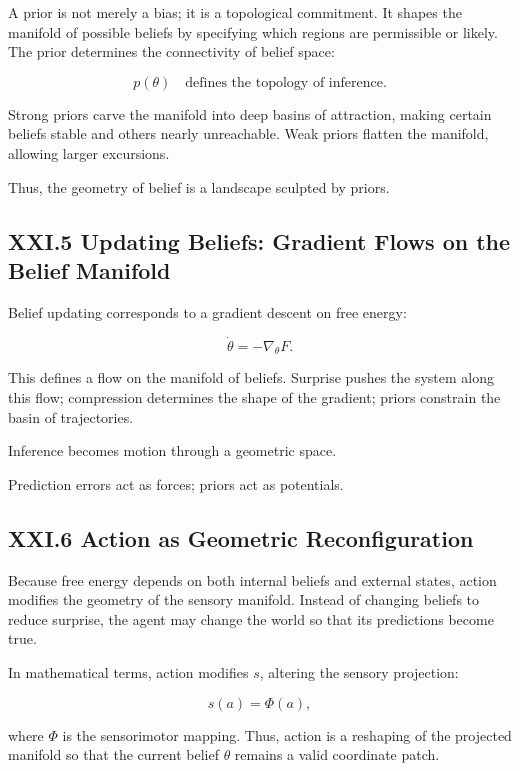 \documentclass[12pt,letterpaper]{article}
\begin{document}
A prior is not merely a bias; it is a topological commitment. It shapes the manifold of possible beliefs by specifying which regions are permissible or likely. The prior determines the connectivity of belief space:

\[
p(\theta) \quad \text{defines the topology of inference.}
\]

Strong priors carve the manifold into deep basins of attraction, making certain beliefs stable and others nearly unreachable. Weak priors flatten the manifold, allowing larger excursions.

Thus, the geometry of belief is a landscape sculpted by priors.

\subsection{XXI.5 Updating Beliefs: Gradient Flows on the Belief Manifold}

Belief updating corresponds to a gradient descent on free energy:

\[
\dot{\theta} = -\nabla_\theta F.
\]

This defines a flow on the manifold of beliefs. Surprise pushes the system along this flow; compression determines the shape of the gradient; priors constrain the basin of trajectories.

Inference becomes motion through a geometric space.

Prediction errors act as forces; priors act as potentials.

\subsection{XXI.6 Action as Geometric Reconfiguration}

Because free energy depends on both internal beliefs and external states, action modifies the geometry of the sensory manifold. Instead of changing beliefs to reduce surprise, the agent may change the world so that its predictions become true.

In mathematical terms, action modifies \(s\), altering the sensory projection:

\[
s(a) = \Phi(a),
\]

where \(\Phi\) is the sensorimotor mapping. Thus, action is a reshaping of the projected manifold so that the current belief \(\theta\) remains a valid coordinate patch.
\end{document}
